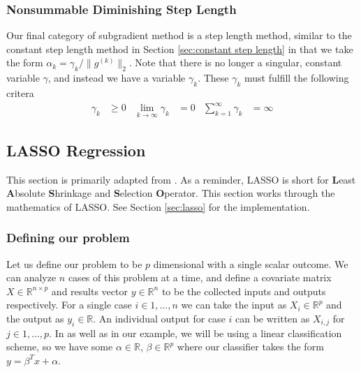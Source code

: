 \documentclass[journal,onecolumn]{IEEEtran}
\begin{document}
\subsubsection{Nonsummable Diminishing Step Length}\label{sec:nonsummable diminishing step length}
Our final category of subgradient method is a step length method, similar to the constant step length method in Section \ref{sec:constant step length} in that we take the form \(\alpha_k = \gamma_k / \|g^{(k)}\|_2\). Note that there is no longer a singular, constant variable \(\gamma\), and instead we have a variable \(\gamma_k\). These \(\gamma_k\) must fulfill the following critera
\begin{equation}\label{eq:nonsummable diminishing step length}
\begin{aligned}
\gamma_k &\geq 0 & 
\lim_{k \rightarrow \infty} \gamma_k &= 0 & 
\sum_{k=1}^{\infty} \gamma_k &= \infty
\end{aligned}
\end{equation}

\subsection{LASSO Regression}\label{sec:math lasso}
This section is primarily adapted from \cite{lassopaper}. As a reminder, LASSO is short for \textbf{L}east \textbf{A}bsolute \textbf{S}hrinkage and \textbf{S}election \textbf{O}perator. This section works through the mathematics of LASSO. See Section \ref{sec:lasso} for the implementation.

\subsubsection{Defining our problem}\label{sec:define lasso problem}
Let us define our problem to be \(p\) dimensional with a single scalar outcome. We can analyze \(n\) cases of this problem at a time, and define a covariate matrix \(X \in \mathbb{R}^{n \times p}\) and results vector \(y \in \mathbb{R}^n\) to be the collected inputs and outputs respectively. For a single case \(i \in 1, \dots, n\) we can take the input as \(X_i \in \mathbb{R}^p\) and the output as \(y_i \in \mathbb{R}\). An individual output for case \(i\) can be written as \(X_{i,j}\) for \(j \in 1, \dots, p\). In \cite{lassopaper} as well as in our example, we will be using a linear classification scheme, so we have some \(\alpha \in \mathbb{R}\), \(\beta \in \mathbb{R}^p\) where our classifier takes the form \(y = \beta^T x + \alpha\).
\end{document}

